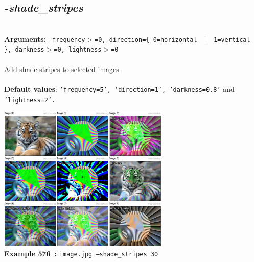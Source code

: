 \documentclass[a4paper,11pt,twoside]{book}
\begin{document}
\subsection{\emph{-shade\_stripes} }\vspace*{-0.5em}
~\\\textbf{Arguments: } 
{\small \texttt{\_frequency$>$=0,\_direction=\{ 0=horizontal ~$|$~ 1=vertical \},\_darkness$>$=0,\_lightness$>$=0}}\\~\\
Add shade stripes to selected images.
~\\~\\\textbf{Default values}: {\small \texttt{'frequency=5', 'direction=1', 'darkness=0.8'} and \texttt{'lightness=2'.}}
\begin{center}\includegraphics[keepaspectratio=true,height=7cm,width=\textwidth]{img/gmic_def576.jpg}\\
{\footnotesize \textbf{Example 576~:} \texttt{image.jpg --shade\_stripes 30}}
\end{center}
\end{document}
